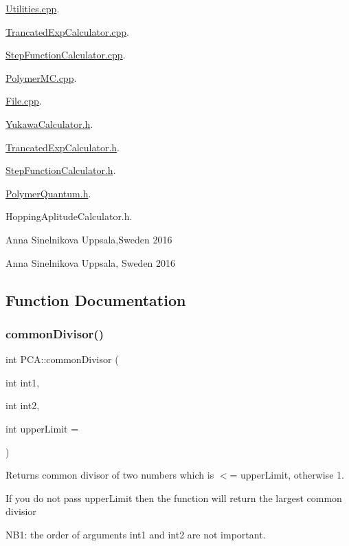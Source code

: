 \hyperlink{_utilities_8cpp}{Utilities.\+cpp}.

\hyperlink{_trancated_exp_calculator_8cpp}{Trancated\+Exp\+Calculator.\+cpp}.

\hyperlink{_step_function_calculator_8cpp}{Step\+Function\+Calculator.\+cpp}.

\hyperlink{_polymer_m_c_8cpp}{Polymer\+M\+C.\+cpp}.

\hyperlink{_file_8cpp}{File.\+cpp}.

\hyperlink{_yukawa_calculator_8h}{Yukawa\+Calculator.\+h}.

\hyperlink{_trancated_exp_calculator_8h}{Trancated\+Exp\+Calculator.\+h}.

\hyperlink{_step_function_calculator_8h}{Step\+Function\+Calculator.\+h}.

\hyperlink{_polymer_quantum_8h}{Polymer\+Quantum.\+h}.

Hopping\+Aplitude\+Calculator.\+h.

Anna Sinelnikova Uppsala,Sweden 2016

Anna Sinelnikova Uppsala, Sweden 2016 

\subsection{Function Documentation}
\hypertarget{namespace_p_c_a_a13d2c7cbde32faf05da77e81c6396b92}{}\label{namespace_p_c_a_a13d2c7cbde32faf05da77e81c6396b92} 
\subsubsection{\texorpdfstring{common\+Divisor()}{commonDivisor()}}
{\footnotesize\ttfamily int P\+C\+A\+::common\+Divisor (\begin{DoxyParamCaption}\item[{int}]{int1,  }\item[{int}]{int2,  }\item[{int}]{upper\+Limit = {} }\end{DoxyParamCaption})}



Returns common divisor of two numbers which is $<$= upper\+Limit, otherwise 1. 

If you do not pass upper\+Limit then the function will return the largest common divisior

N\+B1\+: the order of arguments int1 and int2 are not important.

